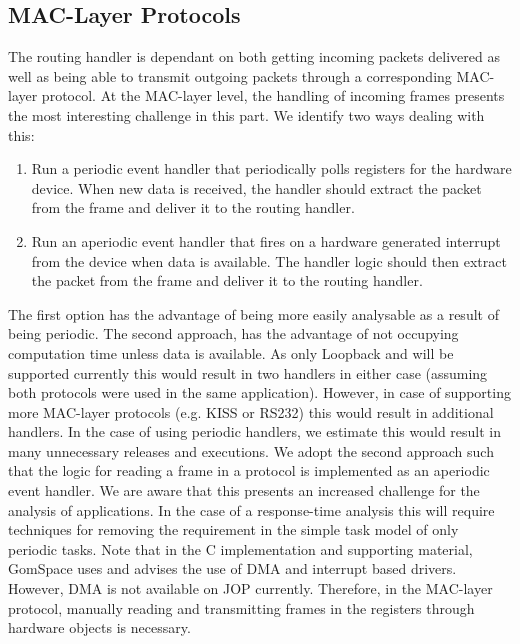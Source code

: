 \subsection{MAC-Layer Protocols}
The routing handler is dependant on both getting incoming packets delivered as well as being able to transmit outgoing packets through a corresponding MAC-layer protocol. At the MAC-layer level, the handling of incoming frames presents the most interesting challenge in this part. We identify two ways dealing with this:
\begin{enumerate}
	\item Run a periodic event handler that periodically polls registers for the hardware device. When new data is received, the handler should extract the packet from the frame and deliver it to the routing handler.
	\item Run an aperiodic event handler that fires on a hardware generated interrupt from the device when data is available. The handler logic should then extract the packet from the frame and deliver it to the routing handler.
\end{enumerate}
 
The first option has the advantage of being more easily analysable as a result of being periodic. The second approach, has the advantage of not occupying computation time unless data is available. As only Loopback and \iic will be supported currently this would result in two handlers in either case (assuming both protocols were used in the same application). However, in case of supporting more MAC-layer protocols (e.g. KISS or RS232) this would result in additional handlers. In the case of using periodic handlers, we estimate this would result in many unnecessary releases and executions. We adopt the second approach such that the logic for reading a frame in a protocol is implemented as an aperiodic event handler. We are aware that this presents an increased challenge for the analysis of applications. In the case of a response-time analysis this will require techniques for removing the requirement in the simple task model of only periodic tasks. Note that in the C implementation and supporting material, GomSpace uses and advises the use of DMA and interrupt based drivers. However, DMA is not available on JOP currently. Therefore, in the \iic MAC-layer protocol, manually reading and transmitting frames in the registers through hardware objects is necessary.
